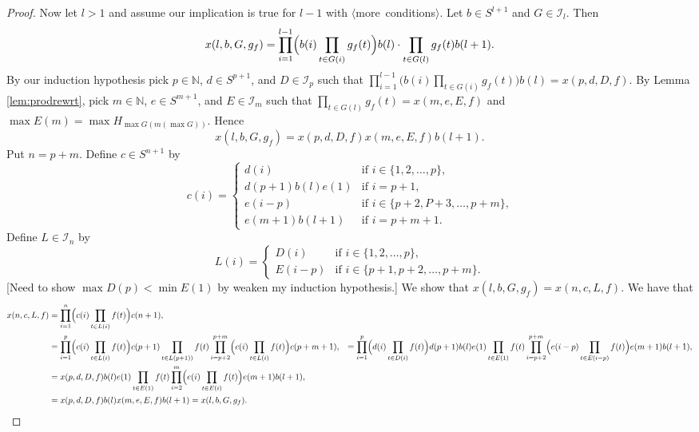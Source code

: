 \documentclass[12pt]{article}
\theoremstyle{plain}
\theoremstyle{definition}
\newcommand{\la}{\langle}
\newcommand{\ra}{\rangle}
\newcommand{\bbN}{\mathbb{N}}
\newcommand{\calI}{\mathcal{I}}
\begin{document}
\begin{proof}
  Now let $l > 1$ and assume our implication is true for $l-1$ with
  \mbox{$\la$more conditions$\ra$}. 
  Let $b \in S^{l+1}$ and $G \in \calI_l$.
  Then 
  \[
    x(l, b, G, g_f) = \prod_{i=1}^{l-1}\Bigl(b(i) \prod_{t \in G(i)}
    g_f(t) \Bigr) b(l) \cdot \prod_{t \in G(l)} g_f(t) b(l+1).
  \]
  By our induction hypothesis pick $p \in \bbN$, $d \in S^{p+1}$, and
  $D \in \calI_p$ such that $\prod_{i=1}^{l-1}\bigl(b(i) \prod_{t \in
    G(i)} g_f(t)\bigr)b(l) = x(p, d, D, f)$.
  By Lemma \ref{lem:prodrewrt}, pick $m \in \bbN$, $e \in S^{m+1}$,
  and $E \in \calI_m$ such that $\prod_{t \in G(l)} g_f(t) = x(m, e,
  E, f)$ and $\max E(m) = \max H_{\max G(m(\max G))}$.
  Hence
  \[
    x(l, b, G, g_f) = x(p, d, D, f)x(m,e,E,f)b(l+1).
  \]
  Put $n = p+m$. 
  Define $c \in S^{n+1}$ by
  \[
    c(i) = 
    \begin{cases}
      d(i) & \mbox{if $i \in \{1, 2, \ldots, p\}$,} \\
      d(p+1)b(l)e(1) & \mbox{if $i=p+1$,} \\
      e(i-p) & \mbox{if $i \in \{p+2, P+3, \ldots, p+m\}$,} \\
      e(m+1)b(l+1) & \mbox{if $i = p + m + 1$.}
    \end{cases}
  \]
  Define $L \in \calI_n$ by
  \[
    L(i) = 
    \begin{cases}
      D(i) & \mbox{if $i \in \{1, 2, \ldots, p\}$}, \\
      E(i-p) & \mbox{if $i \in \{p+1, p+2, \ldots, p+m \}$}.
    \end{cases}
  \]
  [Need to show $\max D(p) < \min E(1)$ by weaken my induction
  hypothesis.] 
  We show that $x(l, b, G, g_f) = x(n, c, L, f)$.
  We have that
  \begin{align*}
    x(n, c, L, f) &= \prod_{i=1}^n\Bigl( c(i) \prod_{t \in L(i)} f(t)
    \Bigr) c(n+1), \\
    &= \prod_{i=1}^p\Bigl( c(i) \prod_{t \in L(i)} f(t) \Bigr) c(p+1)
    \prod_{t \in L(p+1))} f(t) \prod_{i=p+2}^{p+m}\Bigl( c(i) \prod_{t \in L(i)} f(t)
    \Bigr) c(p+m+1),
    &= \prod_{i=1}^p\Bigl( d(i) \prod_{t \in D(i)} f(t) \Bigr) d(p+1)b(l)e(1)
    \prod_{t \in E(1)} f(t) \prod_{i=p+2}^{p+m}\Bigl( e(i-p) \prod_{t \in E(i-p)} f(t)
    \Bigr) e(m+1)b(l+1), \\
    &= x(p, d, D, f) b(l) e(1)
    \prod_{t \in E(1)} f(t) \prod_{i=2}^{m}\Bigl( e(i) \prod_{t \in E(i)} f(t)
    \Bigr) e(m+1)b(l+1), \\
    &= x(p, d, D, f) b(l) x(m, e, E, f) b(l+1) = x(l, b, G, g_f).
  \end{align*}
\end{proof}
\end{document}
